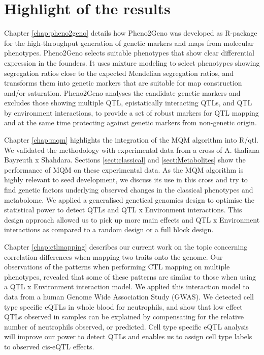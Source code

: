 \section{Highlight of the results}
Chapter \ref{chap:pheno2geno} details how Pheno2Geno was developed as R-package for the high-throughput generation of genetic markers and maps from molecular 
phenotypes. Pheno2Geno selects suitable phenotypes that show clear differential expression in the founders. It uses mixture modeling to 
select phenotypes showing segregation ratios close to the expected Mendelian segregation ratios, and transforms them into genetic 
markers that are suitable for map construction and/or saturation. Pheno2Geno analyses the candidate genetic markers and excludes those 
showing multiple QTL, epistatically interacting QTLs, and QTL by environment interactions, to provide a set of robust markers for 
QTL mapping and at the same time protecting against genetic markers from non-genetic origin.

Chapter \ref{chap:mqm} highlights the integration of the MQM algorithm into R/qtl. We validated the methodology with experimental data from a 
cross of A. thaliana Bayreuth x Shahdara. Sections \ref{sect:classical} and \ref{sect:Metabolites} show the performance of MQM on these experimental data. As the MQM 
algorithm is highly relevant to seed development, we discuss its use in this cross and try to find genetic factors underlying 
observed changes in the classical phenotypes and metabolome. We applied a generalised genetical genomics design \cite{Li:2009} to optimise the 
statistical power to detect QTLs and QTL x Environment interactions. This design approach allowed us to pick up more main effects 
and QTL x Environment interactions as compared to a random design or a full block design.

Chapter \ref{chap:ctlmapping} describes our current work on the topic concerning correlation differences when mapping two traits onto the genome. Our 
observations of the patterns when performing CTL mapping on multiple phenotypes, revealed that some of these patterns are similar 
to those when using a QTL x Environment interaction model. We applied this interaction model to data from a human Genome Wide 
Association Study (GWAS). We detected cell type specific eQTLs in whole blood for neutrophils, and show that low effect QTLs observed 
in samples can be explained by compensating for the relative number of neutrophils observed, or predicted. Cell type specific eQTL 
analysis will improve our power to detect QTLs and enables us to assign cell type labels to observed cis-eQTL effects.

